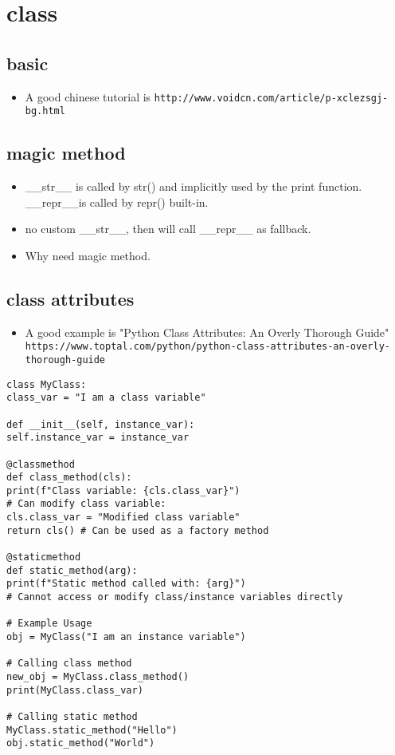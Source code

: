 \documentclass[a4paper,12pt,twoside]{book}
\begin{document}
\chapter{class}
\section{basic}
\begin{itemize}
	\item A good chinese tutorial is \verb!http://www.voidcn.com/article/p-xclezsgj-bg.html!
	
\end{itemize}
\section{magic method}
\begin{itemize}
	\item \_\_str\_\_ is called by str() and implicitly used by the print function. \_\_repr\_\_is called by repr() built-in. 
	\item no custom \_\_str\_\_, then will call \_\_repr\_\_ as fallback. 
	\item Why need magic method. 
\end{itemize}
\section{class attributes}
\begin{itemize}
	
	\item A good example is "Python Class Attributes: An Overly Thorough Guide" \verb!https://www.toptal.com/python/python-class-attributes-an-overly-thorough-guide!
\end{itemize}

\begin{lstlisting}
class MyClass:
class_var = "I am a class variable"

def __init__(self, instance_var):
self.instance_var = instance_var

@classmethod
def class_method(cls):
print(f"Class variable: {cls.class_var}")
# Can modify class variable:
cls.class_var = "Modified class variable"
return cls() # Can be used as a factory method

@staticmethod
def static_method(arg):
print(f"Static method called with: {arg}")
# Cannot access or modify class/instance variables directly

# Example Usage
obj = MyClass("I am an instance variable")

# Calling class method
new_obj = MyClass.class_method() 
print(MyClass.class_var)

# Calling static method
MyClass.static_method("Hello")
obj.static_method("World")
\end{lstlisting}
\end{document}
